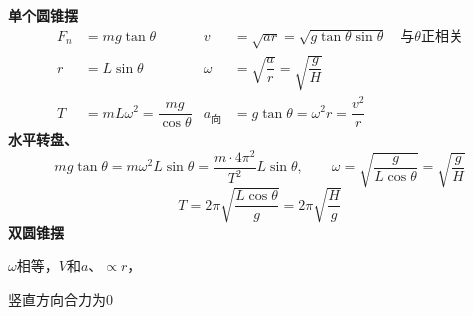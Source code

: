 \textbf{单个圆锥摆}
\begin{align*}
F_n&=mg\tan\theta & v&=\sqrt{ar}=\sqrt{g\tan\theta\sin\theta}\quad\text{与}\theta\text{正相关}\\ %
r&=L\sin\theta & \omega&=\sqrt{\dfrac{a}{r}}=\sqrt{\dfrac{g}{H}}\\
T&=mL\omega^2=\dfrac{mg}{\cos\theta} & a_{\text{向}}&=g\tan\theta=\omega^2r=\dfrac{v^2}{r}
\end{align*}
\textbf{水平转盘、}
\[ mg\tan\theta=m\omega^2L\sin\theta=\dfrac{m\cdot4\pi^2}{T^2}L\sin\theta,\qquad \omega=\sqrt{\dfrac{g}{L\cos\theta}}=\sqrt{\dfrac{g}{H}} \]
\[ T=2\pi\sqrt{\dfrac{L\cos\theta}{g}}=2\pi\sqrt{\dfrac{H}{g}} \]
\textbf{双圆锥摆}


$\omega$相等，$V$和$a$、$\propto r$，

竖直方向合力为0
